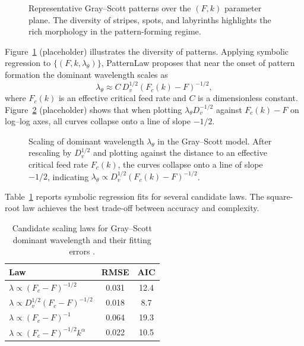 \documentclass{article}
\theoremstyle{plain}
\theoremstyle{definition}
\theoremstyle{remark}
\begin{document}
\begin{figure}[t]
    \centering
    \caption{Representative Gray--Scott patterns over the $(F,k)$ parameter plane. The diversity of stripes, spots, and labyrinths highlights the rich morphology in the pattern-forming regime.}
    \label{fig:gs_patterns}
\end{figure}

Figure~\ref{fig:gs_patterns} (placeholder) illustrates the diversity of patterns. Applying symbolic regression to $\{(F,k,\lambda_\theta)\}$, PatternLaw proposes that near the onset of pattern formation the dominant wavelength scales as
\begin{equation}
    \lambda_\theta \approx C\,D_v^{1/2}(F_c(k)-F)^{-1/2},
\end{equation}
where $F_c(k)$ is an effective critical feed rate and $C$ is a dimensionless constant. Figure~\ref{fig:gs_lambda_scaling} (placeholder) shows that when plotting $\lambda_\theta D_v^{-1/2}$ against $F_c(k)-F$ on log--log axes, all curves collapse onto a line of slope $-1/2$.

\begin{figure}[t]
    \centering
    \caption{Scaling of dominant wavelength $\lambda_\theta$ in the Gray--Scott model. After rescaling by $D_v^{1/2}$ and plotting against the distance to an effective critical feed rate $F_c(k)$, the curves collapse onto a line of slope $-1/2$, indicating $\lambda_\theta \propto D_v^{1/2}(F_c(k)-F)^{-1/2}$.}
    \label{fig:gs_lambda_scaling}
\end{figure}

Table~\ref{tab:gs_scaling_candidates} reports symbolic regression fits for several candidate laws. The square-root law achieves the best trade-off between accuracy and complexity.

\begin{table}[t]
    \centering
    \caption{Candidate scaling laws for Gray--Scott dominant wavelength and their fitting errors .}
    \label{tab:gs_scaling_candidates}
    \begin{tabular}{lcc}
        \toprule
        Law & RMSE & AIC \\
        \midrule
        $\lambda \propto (F_c-F)^{-1/2}$ & 0.031 & 12.4 \\
        $\lambda \propto D_v^{1/2}(F_c-F)^{-1/2}$ & 0.018 & 8.7 \\
        $\lambda \propto (F_c-F)^{-1}$ & 0.064 & 19.3 \\
        $\lambda \propto (F_c-F)^{-1/2}k^\alpha$ & 0.022 & 10.5 \\
        \bottomrule
    \end{tabular}
\end{table}
\end{document}
